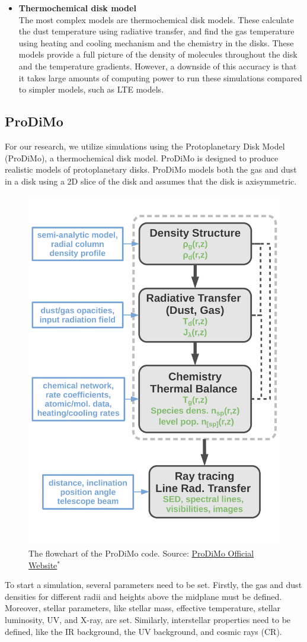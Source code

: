 \documentclass[oneside, single, authoryear, semicolon, 12pt]{lion-msc}
\newcommand{\4}{$_4$}
\newcommand{\3}{$_3$}
\newcommand{\2}{$_2$}
\begin{document}
\begin{itemize}
    \item \textbf{Thermochemical disk model} \\
    The most complex models are thermochemical disk models. These calculate the dust temperature using radiative transfer, and find the gas temperature using heating and cooling mechanism and the chemistry in the disks. These models provide a full picture of the density of molecules throughout the disk and the temperature gradients. However, a downside of this accuracy is that it takes large amounts of computing power to run these simulations compared to simpler models, such as LTE models. 
\end{itemize}

\subsection{ProDiMo}
For our research, we utilize simulations using the Protoplanetary Disk Model (ProDiMo), a thermochemical disk model. ProDiMo is designed to produce realistic models of protoplanetary disks. ProDiMo models both the gas and dust in a disk using a 2D slice of the disk and assumes that the disk is axisymmetric.

\begin{figure}[H]
    \centering
    \includegraphics[width=0.5\linewidth]{Figures/prodimoflowchart (1).png}
    \caption{The flowchart of the ProDiMo code. Source: \href{https://prodimo.iwf.oeaw.ac.at/}{ProDiMo Official Website}$^*$}
    \label{fig:enter-label}
\end{figure}
To start a simulation, several parameters need to be set. Firstly, the gas and dust densities for different radii and heights above the midplane must be defined. Moreover, stellar parameters, like stellar mass, effective temperature, stellar luminosity, UV, and X-ray, are set. Similarly, interstellar properties need to be defined, like the IR background, the UV background, and cosmic rays (CR). 
\end{document}
